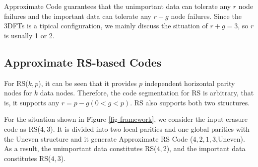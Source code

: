 \documentclass[sigconf]{acmart}
\begin{document}
Approximate Code guarantees that the unimportant data can tolerate any $r$ node failures and the important data can tolerate any $r+g$ node failures.
Since the 3DFTs is a tipical configuration, we mainly discuss the situation of $r+g=3$, so $r$ is usually 1 or 2.

\subsection{Approximate RS-based Codes}
For RS($k,p$), it can be seen that it provides $p$ independent horizontal parity nodes for $k$ data nodes. Therefore, the code segmentation for RS is arbitrary, that is, it supports any $r=p-g(0<g<p)$. RS also supports both two structures.

For the situation shown in Figure \ref{fig-framework}, we consider the input erasure code as RS($4,3$). It is divided into two local parities and one global parities with the Uneven structure and it generate Approximate RS Code ($4,2,1,3$,Uneven).
As a result, the unimportant data constitutes RS($4,2$), and the important data constitutes RS($4,3$).
\end{document}
